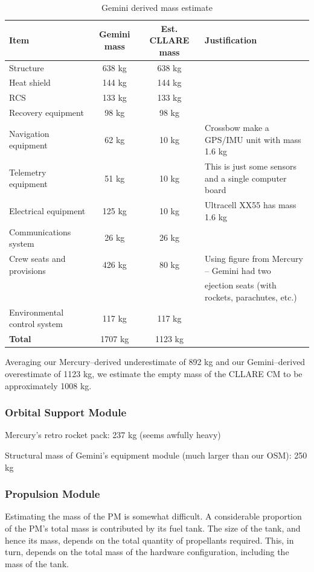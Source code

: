 \documentclass{report}
\begin{document}
\begin{table}
\centering
\begin{tabular}{|l|c|c|l|}
\hline
Item	& Gemini mass & Est. CLLARE mass & Justification \\
\hline \hline
Structure		& 638 kg	& 638 kg &  \\
Heat shield		& 144 kg	& 144 kg & \\
RCS			& 133 kg	& 133 kg & \\
Recovery equipment	& 98 kg		& 98 kg & \\
Navigation equipment	& 62 kg		& 10 kg & Crossbow make a GPS/IMU unit with mass 1.6 kg \\
Telemetry equipment	& 51 kg		& 10 kg & This is just some sensors and a single computer board \\
Electrical equipment	& 125 kg	& 10 kg & Ultracell XX55 has mass 1.6 kg \\
Communications system	& 26 kg		& 26 kg & \\
Crew seats and provisions & 426 kg	& 80 kg & Using figure from Mercury -- Gemini had two \\
				& 	&	& ejection seats (with rockets, parachutes, etc.) \\
Environmental control system	&  117 kg		& 117 kg & \\
\hline \hline
\textbf{Total}	& 1707 kg & 1123 kg	& \\
\hline
\end{tabular}
\caption{Gemini derived mass estimate}
\label{tab:geminimass}
\end{table} 

Averaging our Mercury--derived underestimate of 892 kg and our Gemini--derived overestimate of 1123 kg, we estimate the empty mass of the CLLARE CM to be approximately 1008 kg.

\subsubsection{Orbital Support Module}

Mercury's retro rocket pack: 237 kg (seems awfully heavy)

Structural mass of Gemini's equipment module (much larger than our OSM): 250 kg

\subsubsection{Propulsion Module}

Estimating the mass of the PM is somewhat difficult.  A considerable proportion of the PM's total mass is contributed by its fuel tank.  The size of the tank, and hence its mass, depends on the total quantity of propellants required.  This, in turn, depends on the total mass of the hardware configuration, including the mass of the tank.
\end{document}
